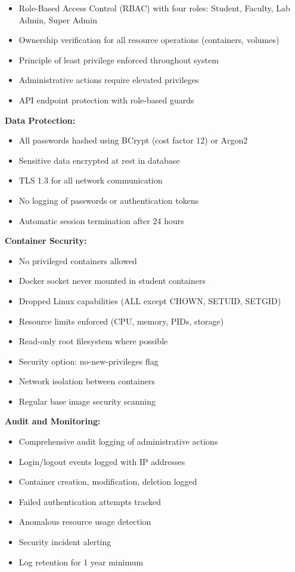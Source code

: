 \documentclass[12pt,a4paper]{article}
\begin{document}
\begin{itemize}
    \item Role-Based Access Control (RBAC) with four roles: Student, Faculty, Lab Admin, Super Admin
    \item Ownership verification for all resource operations (containers, volumes)
    \item Principle of least privilege enforced throughout system
    \item Administrative actions require elevated privileges
    \item API endpoint protection with role-based guards
\end{itemize}

\textbf{Data Protection:}

\begin{itemize}
    \item All passwords hashed using BCrypt (cost factor 12) or Argon2
    \item Sensitive data encrypted at rest in database
    \item TLS 1.3 for all network communication
    \item No logging of passwords or authentication tokens
    \item Automatic session termination after 24 hours
\end{itemize}
\textbf{Container Security:}

\begin{itemize}
    \item No privileged containers allowed
    \item Docker socket never mounted in student containers
    \item Dropped Linux capabilities (ALL except CHOWN, SETUID, SETGID)
    \item Resource limits enforced (CPU, memory, PIDs, storage)
    \item Read-only root filesystem where possible
    \item Security option: no-new-privileges flag
    \item Network isolation between containers
    \item Regular base image security scanning
\end{itemize}

\textbf{Audit and Monitoring:}

\begin{itemize}
    \item Comprehensive audit logging of administrative actions
    \item Login/logout events logged with IP addresses
    \item Container creation, modification, deletion logged
    \item Failed authentication attempts tracked
    \item Anomalous resource usage detection
    \item Security incident alerting
    \item Log retention for 1 year minimum
\end{itemize}
\end{document}

